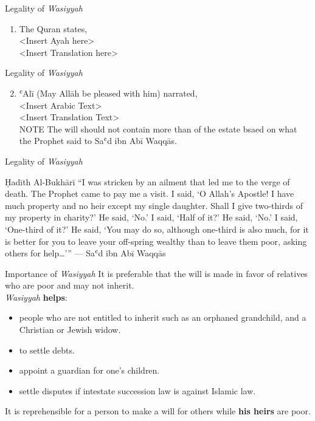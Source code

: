 \begin{frame}{Legality of \textit{Wasiyyah}}
\begin{enumerate}
\item The Quran states,\\
<Insert Ayah here>\\
<Insert Translation here>
\end{enumerate}
\end{frame}

\begin{frame}{Legality of \textit{Wasiyyah}}
\begin{enumerate}
\setcounter{enumi}{1}
\item ʿAlī (May Allāh be pleased with him) narrated,\\
<Insert Arabic Text>\\
<Insert Translation Text>\\
\alert{NOTE} The will should not contain more than  of the estate bsaed on what the Prophet \pbuh said to Saʿd ibn Abī Waqqās.
\end{enumerate}

\end{frame}

\begin{frame}{Legality of \textit{Wasiyyah}}
\begin{block}{Ḥadīth \hfill Al-Bukhārī}
“I was stricken by an ailment that led me to the verge of death. The Prophet \pbuh came to pay me a visit. I said, ‘O Allah's Apostle! I have much property and no heir except my single daughter. Shall I give two-thirds of my property in charity?’ He said, ‘No.’ I said, ‘Half of it?’ He said, ‘No.’ I said, ‘One-third of it?’ He said, ‘You may do so, although one-third is also much, for it is better for you to leave your off-spring wealthy than to leave them poor, asking others for help…’” \hfill --- Saʿd ibn Abī Waqqās
\end{block}
\end{frame}

\begin{frame}{Importance of \textit{Wasiyyah}}
It is preferable that the will is made in favor of relatives who are poor and may not inherit.\\[16pt]

\textit{Wasiyyah} \textbf{helps}:
\begin{itemize}
\item people who are not entitled to inherit such as an orphaned grandchild, and a Christian or Jewish widow.
\item to settle debts.
\item appoint a guardian for one's children.
\item settle disputes if intestate succession law is against Islamic law.
\end{itemize}

It is \alert{reprehensible} for a person to make a will for others while \textbf{his heirs} are poor.
\end{frame}

